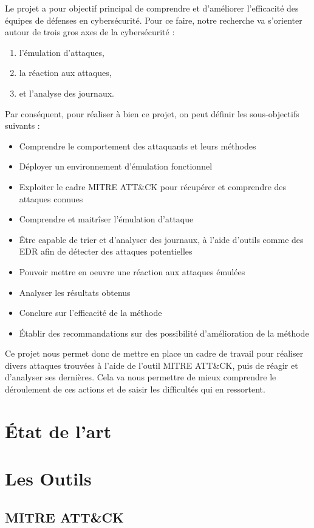 \documentclass[12pt,letterpaper]{article}
\begin{document}
Le projet a pour objectif principal de comprendre et d'améliorer l'efficacité des équipes de défenses en cybersécurité. Pour ce faire, notre recherche va s'orienter autour de trois gros axes de la cybersécurité :  
\begin{enumerate}
    \item l'émulation d'attaques,
    \item la réaction aux attaques,
    \item et l'analyse des journaux.
\end{enumerate}
Par conséquent, pour réaliser à bien ce projet, on peut définir les sous-objectifs suivants :
\begin{itemize}
    \item Comprendre le comportement des attaquants et leurs méthodes
    \item Déployer un environnement d'émulation fonctionnel
    \item Exploiter le cadre MITRE ATT\&CK pour récupérer et comprendre des attaques connues
    \item Comprendre et maitrîser l'émulation d'attaque
    \item Être capable de trier et d'analyser des journaux, à l'aide d'outils comme des EDR afin de détecter des attaques potentielles
    \item Pouvoir mettre en oeuvre une réaction aux attaques émulées
    \item Analyser les résultats obtenus
    \item Conclure sur l'efficacité de la méthode
    \item Établir des recommandations sur des possibilité d'amélioration de la méthode
\end{itemize}

Ce projet nous permet donc de mettre en place un cadre de travail pour réaliser divers attaques trouvées à l'aide de l'outil MITRE ATT\&CK, puis de réagir et d'analyser ses dernières. Cela va nous permettre de mieux comprendre le déroulement de ces actions et de saisir les difficultés qui en ressortent.

\newpage
\section{État de l'art}
\section{Les Outils}

\subsection{MITRE ATT\&CK}
\end{document}
